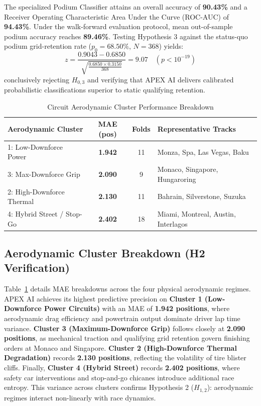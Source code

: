 \documentclass[journal]{IEEEtran}
\begin{document}
The specialized Podium Classifier attains an overall accuracy of \textbf{90.43\%} and a Receiver Operating Characteristic Area Under the Curve (ROC-AUC) of \textbf{94.43\%}. Under the walk-forward evaluation protocol, mean out-of-sample podium accuracy reaches \textbf{89.46\%}. Testing Hypothesis 3 against the status-quo podium grid-retention rate ($p_0 = 68.50\%$, $N = 368$) yields:
\begin{equation}
z = \frac{0.9043 - 0.6850}{\sqrt{\frac{0.6850 \times 0.3150}{368}}} = 9.07 \quad (p < 10^{-19})
\end{equation}
conclusively rejecting $H_{0,3}$ and verifying that APEX AI delivers calibrated probabilistic classifications superior to static qualifying retention.

\begin{table}[!htbp]
\centering
\caption{Circuit Aerodynamic Cluster Performance Breakdown}
\label{tab:cluster_performance}
\begin{tabular}{lccl}
\toprule
\textbf{Aerodynamic Cluster} & \textbf{MAE (pos)} & \textbf{Folds} & \textbf{Representative Tracks} \\
\midrule
1: Low-Downforce Power & \textbf{1.942} & 11 & Monza, Spa, Las Vegas, Baku \\
3: Max-Downforce Grip & \textbf{2.090} & 9 & Monaco, Singapore, Hungaroring \\
2: High-Downforce Thermal & \textbf{2.130} & 11 & Bahrain, Silverstone, Suzuka \\
4: Hybrid Street / Stop-Go & \textbf{2.402} & 18 & Miami, Montreal, Austin, Interlagos \\
\bottomrule
\end{tabular}
\end{table}

\subsection{Aerodynamic Cluster Breakdown (H2 Verification)}
Table~\ref{tab:cluster_performance} details MAE breakdowns across the four physical aerodynamic regimes. APEX AI achieves its highest predictive precision on \textbf{Cluster 1 (Low-Downforce Power Circuits)} with an MAE of \textbf{1.942 positions}, where aerodynamic drag efficiency and powertrain output dominate driver lap time variance. \textbf{Cluster 3 (Maximum-Downforce Grip)} follows closely at \textbf{2.090 positions}, as mechanical traction and qualifying grid retention govern finishing orders at Monaco and Singapore. \textbf{Cluster 2 (High-Downforce Thermal Degradation)} records \textbf{2.130 positions}, reflecting the volatility of tire blister cliffs. Finally, \textbf{Cluster 4 (Hybrid Street)} records \textbf{2.402 positions}, where safety car interventions and stop-and-go chicanes introduce additional race entropy. This variance across clusters confirms Hypothesis 2 ($H_{1,2}$): aerodynamic regimes interact non-linearly with race dynamics.
\end{document}
